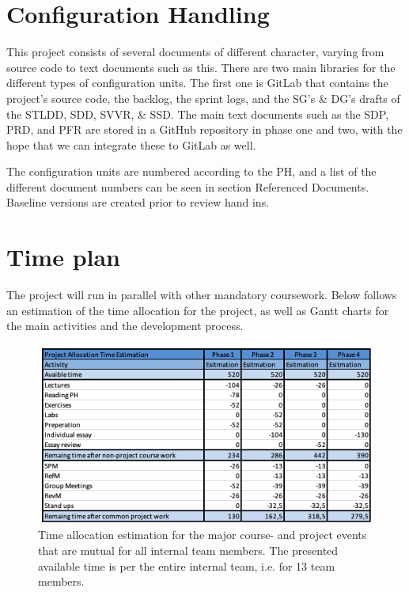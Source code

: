 \documentclass{article}
\begin{document}
\section{Configuration Handling}
This project consists of several documents of different character, varying from source code to text documents such as this. There are two main libraries for the different types of configuration units. The first one is GitLab that contains the project's source code, the backlog, the sprint logs, and the SG's \& DG's drafts of the STLDD, SDD, SVVR, \& SSD. The main text documents such as the SDP, PRD, and PFR are stored in a GitHub repository in phase one and two, with the hope that we can integrate these to GitLab as well.

The configuration units are numbered according to the PH, and a list of the different document numbers can be seen in section Referenced Documents. Baseline versions are created prior to review hand ins.  

\section{Time plan}
The project will run in parallel with other mandatory coursework. Below follows an estimation of the time allocation for the project, as well as Gantt charts for the main activities and the development process. 

\begin{figure}[H]
    \centering
    \includegraphics[scale=0.8]{sdpFigures/TimeEstPart1V2.png}
    \caption{Time allocation estimation for the major course- and project events that are mutual for all internal team members. The presented available time is per the entire internal team, i.e. for 13 team members.}
    \label{fig:timeEst1}
\end{figure}
\end{document}
